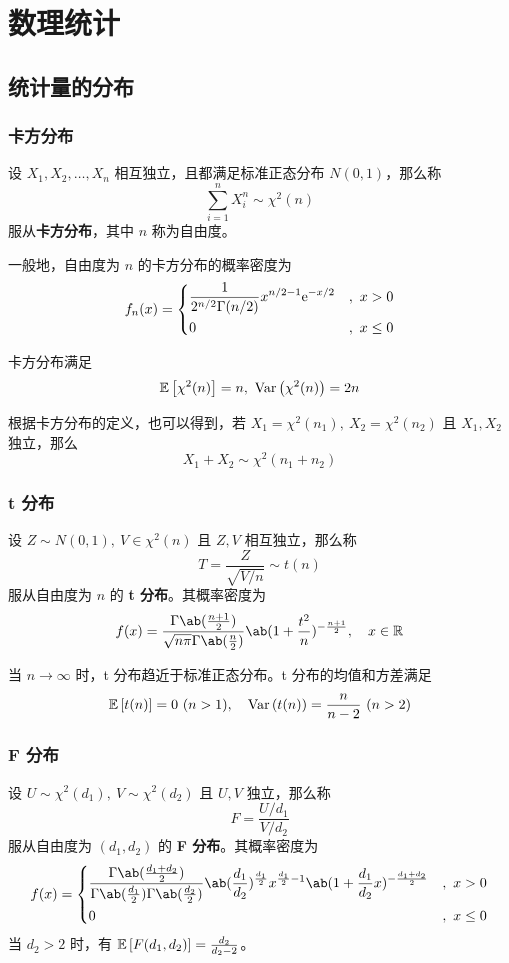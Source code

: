 \section{数理统计}

\subsection{统计量的分布}

\subsubsection{卡方分布}

设 $X_1, X_2,\dots, X_n$ 相互独立，且都满足标准正态分布 $N(0, 1)$，那么称
$$
\sum_{i = 1}^{n} X_i^n \sim \chi^2(n)
$$
服从\textbf{卡方分布}，其中 $n$ 称为自由度。

一般地，自由度为 $n$ 的卡方分布的概率密度为
$$
f_n(x) = \begin{dcases}
    \frac{1}{2^{n / 2} \Gamma(n / 2)} x^{n / 2 - 1} \E^{-x / 2} &,\ x > 0 \\
    0 &,\ x \le 0
\end{dcases}
$$

卡方分布满足
$$
\expect{\chi^2(n)} = n,\ \variance{\chi^2(n)} = 2n
$$

根据卡方分布的定义，也可以得到，若 $X_1 = \chi^2(n_1),\ X_2 = \chi^2(n_2)$ 且 $X_1, X_2$ 独立，那么
$$
X_1 + X_2 \sim \chi^2(n_1 + n_2)
$$

\subsubsection{t 分布}

设 $Z \sim N(0, 1),\ V \in \chi^2(n)$ 且 $Z, V$ 相互独立，那么称
$$
T = \frac{Z}{\sqrt{V / n}} \sim t(n)
$$
服从自由度为 $n$ 的 \textbf{t 分布}。其概率密度为
$$
f(x)=\frac{\Gamma\ab(\frac{n + 1}{2})}{\sqrt{n \pi} \Gamma\ab(\frac{n}{2})} \ab(1 + \frac{t^2}{n})^{-\frac{n + 1}{2}},\quad x\in\RR
$$

当 $n \to \infty$ 时，t 分布趋近于标准正态分布。t 分布的均值和方差满足
$$
\operatorname{\mathbb{E}}\left[t(n)\right] = 0\ (n > 1), \quad \operatorname{Var}\left(t(n)\right) = \frac{n}{n - 2}\ (n > 2)
$$

\subsubsection{F 分布}

设 $U \sim \chi^2(d_1),\ V \sim \chi^2(d_2)$ 且 $U, V$ 独立，那么称
$$
F = \frac{U / d_1}{V / d_2}
$$
服从自由度为 $(d_1, d_2)$ 的 \textbf{F 分布}。其概率密度为
$$
f(x) = \begin{dcases}
    \frac{\Gamma\ab(\frac{d_1 + d_2}{2})}{\Gamma\ab(\frac{d_1}{2}) \Gamma\ab(\frac{d_2}{2})} \ab(\frac{d_1}{d_2})^{\frac{d_1}{2}} x^{\frac{d_1}{2} - 1} \ab(1 + \frac{d_1}{d_2} x)^{- \frac{d_1 + d_2}{2}} &,\ x > 0 \\
    0 &,\ x \le 0
\end{dcases}
$$
当 $d_2 > 2$ 时，有 $\operatorname{\mathbb{E}}\left[F(d_1, d_2)\right] = \frac{d_2}{d_2 - 2}$。


